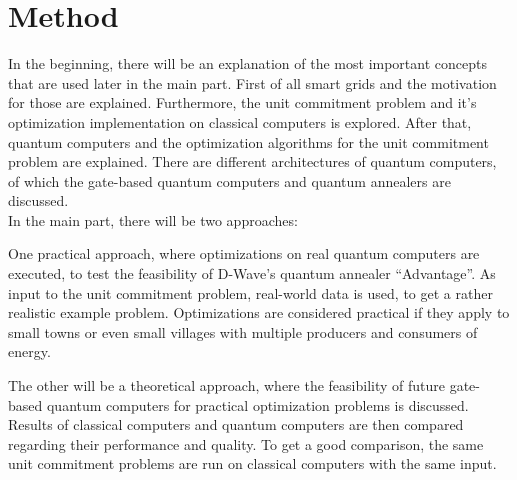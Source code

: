 \section{Method}

In the beginning, there will be an explanation of the most important concepts
that are used later in the main part.
First of all smart grids and the motivation for those are explained.
Furthermore, the unit commitment problem and it's optimization implementation on classical computers
is explored.
After that, quantum computers and the optimization algorithms for the unit commitment problem are explained.
There are different architectures of quantum computers,
of which the gate-based quantum computers and quantum annealers are discussed. \\

\noindent In the main part, there will be two approaches:

One practical approach, where optimizations on real quantum computers are executed,
to test the feasibility of D-Wave's quantum annealer ``Advantage''.
As input to the unit commitment problem, real-world data is used, to get a rather realistic example problem.
Optimizations are considered practical if they apply to small towns or even small villages
with multiple producers and consumers of energy.

The other will be a theoretical approach, where the feasibility of future gate-based quantum computers
for practical optimization problems is discussed. \\

Results of classical computers and quantum computers are then compared
regarding their performance and quality.
To get a good comparison, the same unit commitment problems are run on classical computers with the same input.
